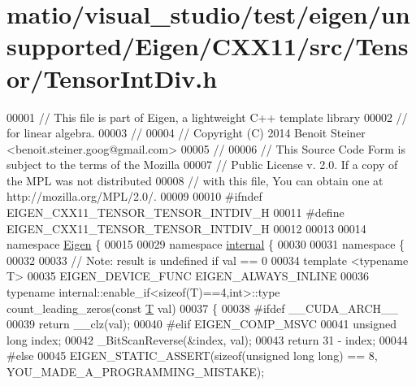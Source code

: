 \hypertarget{matio_2visual__studio_2test_2eigen_2unsupported_2_eigen_2_c_x_x11_2src_2_tensor_2_tensor_int_div_8h_source}{}\section{matio/visual\+\_\+studio/test/eigen/unsupported/\+Eigen/\+C\+X\+X11/src/\+Tensor/\+Tensor\+Int\+Div.h}
\label{matio_2visual__studio_2test_2eigen_2unsupported_2_eigen_2_c_x_x11_2src_2_tensor_2_tensor_int_div_8h_source}

\begin{DoxyCode}
00001 \textcolor{comment}{// This file is part of Eigen, a lightweight C++ template library}
00002 \textcolor{comment}{// for linear algebra.}
00003 \textcolor{comment}{//}
00004 \textcolor{comment}{// Copyright (C) 2014 Benoit Steiner <benoit.steiner.goog@gmail.com>}
00005 \textcolor{comment}{//}
00006 \textcolor{comment}{// This Source Code Form is subject to the terms of the Mozilla}
00007 \textcolor{comment}{// Public License v. 2.0. If a copy of the MPL was not distributed}
00008 \textcolor{comment}{// with this file, You can obtain one at http://mozilla.org/MPL/2.0/.}
00009 
00010 \textcolor{preprocessor}{#ifndef EIGEN\_CXX11\_TENSOR\_TENSOR\_INTDIV\_H}
00011 \textcolor{preprocessor}{#define EIGEN\_CXX11\_TENSOR\_TENSOR\_INTDIV\_H}
00012 
00013 
00014 \textcolor{keyword}{namespace }\hyperlink{namespace_eigen}{Eigen} \{
00015 
00029 \textcolor{keyword}{namespace }\hyperlink{namespaceinternal}{internal} \{
00030 
00031 \textcolor{keyword}{namespace }\{
00032 
00033   \textcolor{comment}{// Note: result is undefined if val == 0}
00034   \textcolor{keyword}{template} <\textcolor{keyword}{typename} T>
00035   EIGEN\_DEVICE\_FUNC EIGEN\_ALWAYS\_INLINE
00036   \textcolor{keyword}{typename} internal::enable\_if<sizeof(T)==4,int>::type count\_leading\_zeros(\textcolor{keyword}{const} 
      \hyperlink{group___sparse_core___module_class_eigen_1_1_triplet}{T} val)
00037   \{
00038 \textcolor{preprocessor}{#ifdef \_\_CUDA\_ARCH\_\_}
00039     \textcolor{keywordflow}{return} \_\_clz(val);
00040 \textcolor{preprocessor}{#elif EIGEN\_COMP\_MSVC}
00041     \textcolor{keywordtype}{unsigned} \textcolor{keywordtype}{long} index;
00042     \_BitScanReverse(&index, val);
00043     \textcolor{keywordflow}{return} 31 - index;
00044 \textcolor{preprocessor}{#else}
00045     EIGEN\_STATIC\_ASSERT(\textcolor{keyword}{sizeof}(\textcolor{keywordtype}{unsigned} \textcolor{keywordtype}{long} \textcolor{keywordtype}{long}) == 8, YOU\_MADE\_A\_PROGRAMMING\_MISTAKE);

\end{DoxyCode}
